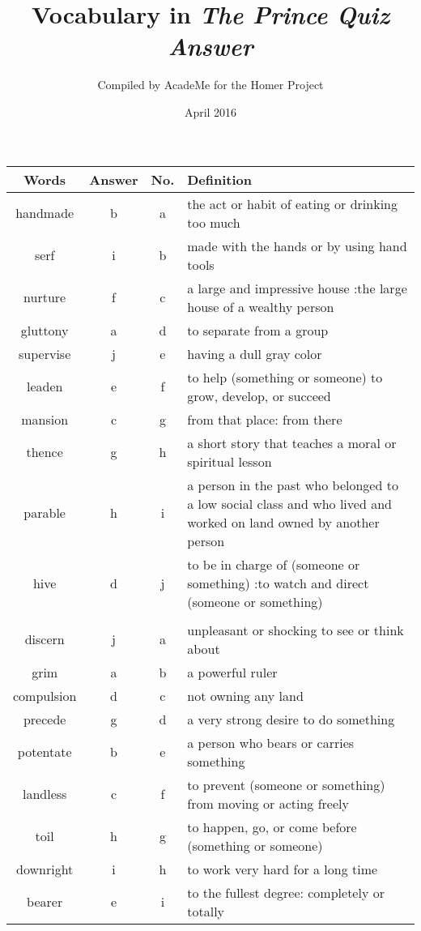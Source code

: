 \documentclass[a4paper]{article}
\title{Vocabulary in \textit{The Prince Quiz Answer}}
\author{Compiled by AcadeMe for the Homer Project}
\date{April 2016}
\begin{document}
\maketitle
\begin{center}
\begin{tabular}{|c|c|c|m{}|}
\hline
Words & Answer & No. & Definition \\
\hline
handmade & b & a &  the act or habit of eating or drinking too much\\
\hline
serf & i & b &  made with the hands or by using hand tools \\
\hline
nurture & f & c &  a large and impressive house :the large house of a wealthy person \\
\hline
gluttony & a & d &  to separate from a group \\
\hline
supervise & j & e &  having a dull gray color \\
\hline
leaden & e & f &  to help (something or someone) to grow, develop, or succeed \\
\hline
mansion & c & g &  from that place: from there \\
\hline
thence & g & h &  a short story that teaches a moral or spiritual lesson \\
\hline
parable & h & i &  a person in the past who belonged to a low social class and who lived and worked on land owned by another person \\
\hline
hive & d & j &  to be in charge of (someone or something) :to watch and direct (someone or something) \\
\hline
 & & & \\
\hline
discern & j & a &  unpleasant or shocking to see or think about \\
\hline
grim & a & b &  a powerful ruler \\
\hline
compulsion & d & c &  not owning any land \\
\hline
precede & g & d &  a very strong desire to do something \\
\hline
potentate & b & e &  a person who bears or carries something \\
\hline
landless & c & f &  to prevent (someone or something) from moving or acting freely \\
\hline
toil & h & g &  to happen, go, or come before (something or someone) \\
\hline
downright & i & h &  to work very hard for a long time \\
\hline
bearer & e & i &  to the fullest degree: completely or totally \\

\end{tabular}
\end{center}
\end{document}
